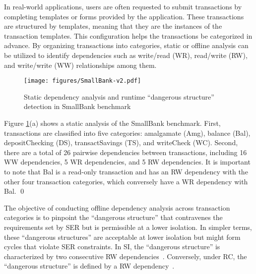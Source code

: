 In real-world applications, users are often requested to submit transactions by completing templates or forms provided by the application.
These transactions are structured by templates, meaning that they are the instances of the transaction templates.
This configuration helps the transactions be categorized in advance. 
By organizing transactions into categories, static or offline analysis can be utilized to identify dependencies such as write/read (WR), read/write (RW), and write/write (WW) relationships among them.
\begin{figure}[t]
    \centering
    \vspace{3mm}
    \texttt{[image: figures/SmallBank-v2.pdf]}
    \vspace{-4mm}
    \caption{Static dependency analysis and runtime ``dangerous structure'' detection in SmallBank benchmark
    }
    \label{fig:SmallBank}
    \vspace{-4mm}
\end{figure}

\begin{example}
\label{exa:oaofsb}
Figure \ref{fig:SmallBank}(a) shows a static analysis of the SmallBank benchmark.
First, transactions are classified into five categories: amalgamate (Amg), balance (Bal), depositChecking (DS), transactSavings (TS), and writeCheck (WC).
Second, there are a total of 26 pairwise dependencies between transactions, including 16 WW dependencies, 5 WR dependencies, and 5 RW dependencies. It is important to note that Bal is a read-only transaction and has an RW dependency with the other four transaction categories, which conversely have a WR dependency with Bal.
\qed
\end{example}


The objective of conducting offline dependency analysis across transaction categories is to pinpoint the ``dangerous structure'' that contravenes the requirements set by SER but is permissible at a lower isolation. In simpler terms, these ``dangerous structures'' are acceptable at lower isolation but might form cycles that violate SER constraints. In SI, the ``dangerous structure'' is characterized by two consecutive RW dependencies~\cite{DBLP:conf/pods/Fekete05, DBLP:journals/sigmod/FeketeOO04}. Conversely, under RC, the ``dangerous structure'' is defined by a RW dependency~\cite{DBLP:conf/aiccsa/AlomariF15, DBLP:journals/pvldb/VandevoortK0N21}.

